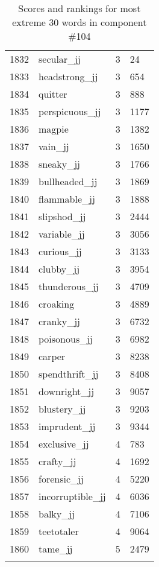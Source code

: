 \begin{longtable}[!htbp]{| rlr@{.}l |}
    1832 & secular\_jj & 3 & 24 \\
    1833 & headstrong\_jj & 3 & 654 \\
    1834 & quitter & 3 & 888 \\
    1835 & perspicuous\_jj & 3 & 1177 \\
    1836 & magpie & 3 & 1382 \\
    1837 & vain\_jj & 3 & 1650 \\
    1838 & sneaky\_jj & 3 & 1766 \\
    1839 & bullheaded\_jj & 3 & 1869 \\
    1840 & flammable\_jj & 3 & 1888 \\
    1841 & slipshod\_jj & 3 & 2444 \\
    1842 & variable\_jj & 3 & 3056 \\
    1843 & curious\_jj & 3 & 3133 \\
    1844 & clubby\_jj & 3 & 3954 \\
    1845 & thunderous\_jj & 3 & 4709 \\
    1846 & croaking & 3 & 4889 \\
    1847 & cranky\_jj & 3 & 6732 \\
    1848 & poisonous\_jj & 3 & 6982 \\
    1849 & carper & 3 & 8238 \\
    1850 & spendthrift\_jj & 3 & 8408 \\
    1851 & downright\_jj & 3 & 9057 \\
    1852 & blustery\_jj & 3 & 9203 \\
    1853 & imprudent\_jj & 3 & 9344 \\
    1854 & exclusive\_jj & 4 & 783 \\
    1855 & crafty\_jj & 4 & 1692 \\
    1856 & forensic\_jj & 4 & 5220 \\
    1857 & incorruptible\_jj & 4 & 6036 \\
    1858 & balky\_jj & 4 & 7106 \\
    1859 & teetotaler & 4 & 9064 \\
    1860 & tame\_jj & 5 & 2479 \\
    \hline
    \caption{Scores and rankings for most extreme 30 words in component \#104} \\
\end{longtable}
